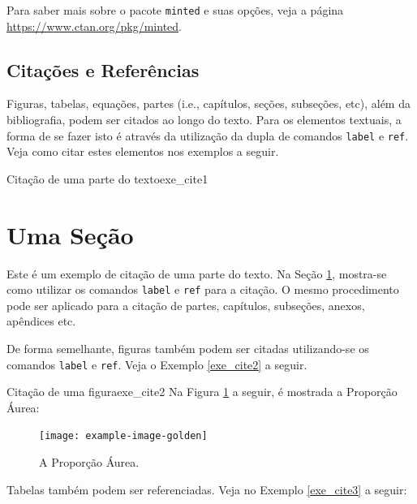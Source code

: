 \begin{marker}
  Para saber mais sobre o pacote {\tt minted} e suas opções, veja a página \url{https://www.ctan.org/pkg/minted}.
\end{marker}

\subsection{Citações e Referências}
\label{sec:refs}

Figuras, tabelas, equações, partes (i.e., capítulos, seções, subseções, etc), além da bibliografia, podem ser citados ao longo do texto. Para os elementos textuais, a forma de se fazer isto é através da utilização da dupla de comandos \texttt{label} e \texttt{ref}. Veja como citar estes elementos nos exemplos a seguir.

\begin{texexptitled}[breakable,enhanced,middle=2mm]{Citação de uma parte do texto}{exe_cite1}
\section{Uma Seção}
\label{sec:minha_secao}

Este é um exemplo de citação de uma parte do texto. Na Seção \ref{sec:minha_secao}, mostra-se como utilizar os comandos {\tt label} e {\tt ref} para a citação. O mesmo procedimento pode ser aplicado para a citação de partes, capítulos, subseções, anexos, apêndices etc.
\end{texexptitled}

De forma semelhante, figuras também podem ser citadas utilizando-se os comandos \texttt{label} e \texttt{ref}. Veja o Exemplo \ref{exe_cite2} a seguir.

\begingroup
\begin{texexptitled}[breakable,enhanced,middle=2mm]{Citação de uma figura}{exe_cite2}
Na Figura \ref{fig:prop_aurea} a seguir, é mostrada a Proporção Áurea:

\begin{figure}[H]
    \centering
    \texttt{[image: example-image-golden]}
    \caption{A Proporção Áurea.}
    \label{fig:prop_aurea}
\end{figure}
\end{texexptitled}
\endgroup

Tabelas também podem ser referenciadas. Veja no Exemplo \ref{exe_cite3} a seguir:

